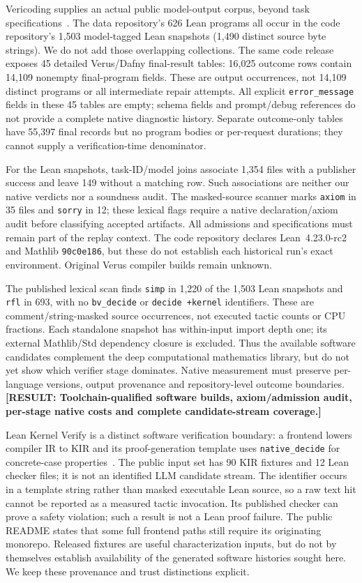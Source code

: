 \documentclass[10pt,twocolumn]{article}
\newcommand{\missing}[1]{\textbf{[RESULT: #1]}}
\begin{document}
Vericoding supplies an actual public model-output corpus, beyond task
specifications~\cite{vericoding2025,vericodingOutputs2026}.
The data repository's 626 Lean programs all occur in the code repository's
1,503 model-tagged Lean snapshots (1,490 distinct source byte strings).
We do not add those overlapping collections.
The same code release exposes 45 detailed Verus/Dafny final-result tables:
16,025 outcome rows contain 14,109 nonempty final-program fields.
These are output occurrences, not 14,109 distinct programs or all intermediate
repair attempts. All explicit \texttt{error\_message} fields in these
45 tables are empty; schema fields and prompt/debug references do not
provide a complete native diagnostic history.
Separate outcome-only tables have 55,397 final records but no program bodies
or per-request durations; they cannot supply a verification-time denominator.

For the Lean snapshots, task-ID/model joins associate 1,354 files with a
publisher success and leave 149 without a matching row.
Such associations are neither our native verdicts nor a soundness audit.
The masked-source scanner marks \texttt{axiom} in 35 files and
\texttt{sorry} in 12; these lexical flags require a native declaration/axiom
audit before classifying accepted artifacts.
All admissions and specifications must remain part of the replay context.
The code repository declares Lean~4.23.0-rc2 and Mathlib
\texttt{90c0e186}, but these do not establish each historical run's exact
environment. Original Verus compiler builds remain unknown.

The published lexical scan finds \texttt{simp} in 1,220 of the 1,503 Lean
snapshots and \texttt{rfl} in 693, with no \texttt{bv\_decide} or
\texttt{decide +kernel} identifiers. These are comment/string-masked source
occurrences, not executed tactic counts or CPU fractions.
Each standalone snapshot has within-input import depth one; its external
Mathlib/Std dependency closure is excluded.
Thus the available software candidates complement the deep computational
mathematics library, but do not yet show which verifier stage dominates.
Native measurement must preserve per-language versions, output provenance
and repository-level outcome boundaries.
\missing{Toolchain-qualified software builds, axiom/admission audit,
per-stage native costs and complete candidate-stream coverage.}

Lean Kernel Verify is a distinct software verification boundary:
a frontend lowers compiler IR to KIR and its proof-generation template
uses \texttt{native\_decide} for concrete-case properties~\cite{leanKernelVerify}.
The public input set has 90 KIR fixtures and 12 Lean checker files;
it is not an identified LLM candidate stream. The identifier occurs in a
template string rather than masked executable Lean source, so a raw text
hit cannot be reported as a measured tactic invocation.
Its published checker can prove a safety violation; such a result is not a
Lean proof failure. The public README states that some full frontend paths
still require its originating monorepo.
Released fixtures are useful characterization inputs, but do not by
themselves establish availability of the generated software histories sought
here. We keep these provenance and trust distinctions explicit.
\end{document}
